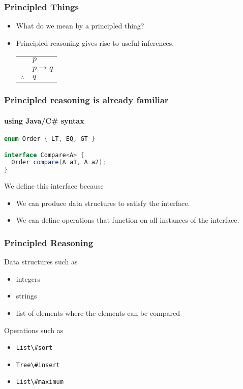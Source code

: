 \begin{frame}
\frametitle{Principled Things}
\begin{itemize}
\item<1-> What do we mean by a principled thing?
\item<2-> Principled reasoning gives rise to useful inferences.
\begin{center}
\begin{tabular}{c@{\,}l@{}} 
  & $p$ \\
  & $p \to q$ \\\cline{2-2}
  $\therefore$         
  & $q$ \\
\end{tabular}
\end{center}
\end{itemize}
\end{frame}

\begin{frame}[fragile]
\frametitle{Principled reasoning is already familiar}
\framesubtitle{using Java/C\# syntax}
\begin{lstlisting}[style=language,language=java]
enum Order { LT, EQ, GT }

interface Compare<A> {
  Order compare(A a1, A a2);
}
\end{lstlisting}
\begin{block}{We define this interface because}
\begin{itemize}
\item We can produce data structures to satisfy the interface.
\item We can define operations that function on all instances of the interface.
\end{itemize}
\end{block}
\end{frame}

\begin{frame}
\frametitle{Principled Reasoning}
\begin{block}{Data structures such as}
\begin{itemize}
\item integers
\item strings
\item list of elements where the elements can be compared
\end{itemize}
\end{block}
\begin{block}{Operations such as}
\begin{itemize}
\item \lstinline{List\#sort}
\item \lstinline{Tree\#insert}
\item \lstinline{List\#maximum}
\end{itemize}
\end{block}
\end{frame}

